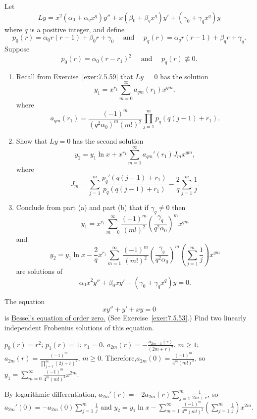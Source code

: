 \documentclass{ximera}
\begin{document}
\begin{problem}\label{exer:7.6.55}
Let
$$
Ly=x^2(\alpha_0+\alpha_qx^q)y''+x(\beta_0+\beta_qx^q)y'+(\gamma_0+\gamma_qx^q)y
$$
where $q$ is a positive integer, and define
$$
p_0(r)=\alpha_0r(r-1)+\beta_0r+\gamma_0\quad\mbox{ and }\quad
p_q(r)=\alpha_qr(r-1)+\beta_qr+\gamma_q.
$$
Suppose
$$
p_0(r)=\alpha_0(r-r_1)^2 \quad\mbox{ and }\quad p_q(r)\not\equiv0.
$$
\begin{enumerate}
\item %
Recall from  Exercise~\ref{exer:7.5.59}  that
 $Ly~=0$ has the solution
$$
y_1=x^{r_1}\sum_{m=0}^\infty a_{qm}(r_1)x^{qm},
$$
where
$$
a_{qm}(r_1)=\frac{(-1)^m}{
(q^2\alpha_0)^m(m!)^2}\prod_{j=1}^mp_q\left(q(j-1)+r_1\right).
$$
\item %
Show that $Ly=0$ has the second solution
$$
y_2=y_1\ln x+x^{r_1}\sum_{m=1}^\infty a_{qm}'(r_1)J_mx^{qm},
$$
where
$$
J_m=\sum_{j=1}^m\frac{p_q'\left(q(j-1)+r_1\right)}{
p_q\left(q(j-1)+r_1\right)}-\frac{2}{ q}\sum_{j=1}^m\frac{1}{ j}.
$$
\item %
Conclude from part (a) and part (b) that if
 $\gamma_q\neq 0$ then
$$
y_1=x^{r_1}\sum_{m=0}^\infty
\frac{(-1)^m}{(m!)^2}\left(\frac{\gamma_q}{ q^2\alpha_0}\right)^mx^{qm}
$$
and
$$
y_2=y_1\ln x-\frac{2}{ q}x^{r_1}\sum_{m=1}^\infty
\frac{(-1)^m}{(m!)^2}\left(\frac{\gamma_q}{
q^2\alpha_0}\right)^m\left(\sum_{j=1}^m\frac{1}{ j}\right)x^{qm}
$$
are solutions of
$$
\alpha_0x^2y''+\beta_0xy'+(\gamma_0+\gamma_qx^q)y=0.
$$
\end{enumerate}
\end{problem}

\begin{problem}\label{exer:7.6.56}
The equation
$$
xy''+y'+xy=0
$$
is
\href{http://www-history.mcs.st-and.ac.uk/Mathematicians/Bessel.html}{Bessel's equation of order zero.} (See
Exercise~\ref{exer:7.5.53}.)
  Find two linearly independent Frobenius solutions of this equation.

  \begin{solution}
      $p_0(r)=r^2$; $p_1(r)=1$; $r_1=0$.
$a_{2m}(r)=-\frac{a_{2m-1}(r)}{(2m+r)^2}$, $m\geq 1$;
$a_{2m}(r)=\frac{(-1)^m}{\prod_{j=1}^m(2j+r)^2}$,  $m\geq 0$.
Therefore,$a_{2m}(0)=\frac{(-1)^m}{4^m(m!)^2}$, so
$y_1=\sum_{m=0}^\infty\frac{(-1)^m}{4^m(m!)^2}x^{2m}$.

By logarithmic differentiation, $a_{2m}'(r)=-2a_{2m}(r)
\sum_{j=1}^m\frac{1}{2m+r}$, so
 $a_{2m}'(0)=-a_{2m}(0)\sum_{j=1}^m\frac{1}{ j}$ and
$y_2=y_1\ln x-
\sum_{m=1}^\infty\frac{(-1)^m}{4^m(m!)^2}
\left(\sum_{j=1}^m\frac{1}{ j}\right)x^{2m}$.
  \end{solution}
  \end{problem}
\end{document}
